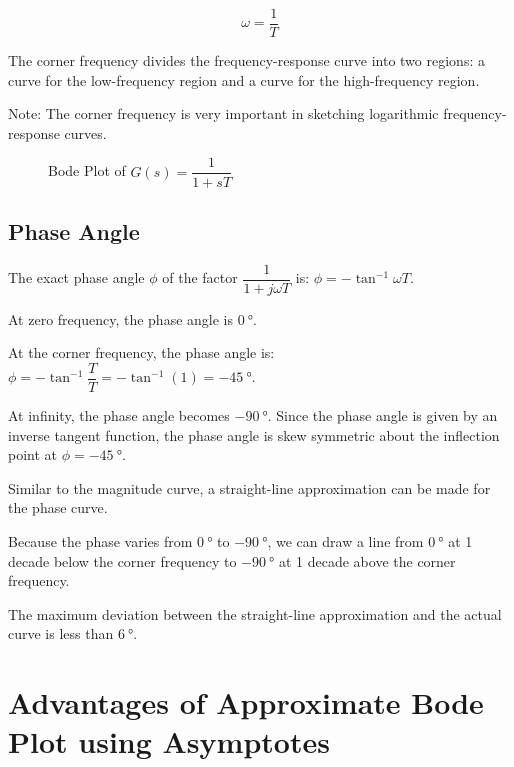 \documentclass[
  14pt,
  a4paper,
  oneside,
  open=any,
  a4paper,
  14pt]{report}
\begin{document}
\[
\omega = \dfrac{1}{T}
\]

The corner frequency divides the frequency-response curve into two
regions: a curve for the low-frequency region and a curve for the
high-frequency region.

Note: The corner frequency is very important in sketching logarithmic
frequency-response curves.

\begin{figure}

\centering{



}

\caption{\label{fig-bode-plot-simple-pole}Bode Plot of
\(G(s) = \dfrac{1}{1+sT}\)}

\end{figure}%

\subsection{Phase Angle}\label{phase-angle-1}

The exact phase angle \(\phi\) of the factor \(\dfrac{1}{1+j\omega T}\)
is: \(\phi = -\tan^{-1} \omega T\).

At zero frequency, the phase angle is \(\SI{0}{\degree}\).

At the corner frequency, the phase angle is:
\(\phi = -\tan^{-1} \dfrac{T}{T} = -\tan^{-1} (1) = \SI{-45}{\degree}\).

At infinity, the phase angle becomes \(\SI{-90}{\degree}\). Since the
phase angle is given by an inverse tangent function, the phase angle is
skew symmetric about the inflection point at \(\phi=\SI{-45}{\degree}\).

Similar to the magnitude curve, a straight-line approximation can be
made for the phase curve.

Because the phase varies from \(\SI{0}{\degree}\) to
\(\SI{-90}{\degree}\), we can draw a line from \(\SI{0}{\degree}\) at 1
decade below the corner frequency to \(\SI{-90}{\degree}\) at 1 decade
above the corner frequency.

The maximum deviation between the straight-line approximation and the
actual curve is less than \(\SI{6}{\degree}\).

\newpage{}

\section{Advantages of Approximate Bode Plot using
Asymptotes}\label{advantages-of-approximate-bode-plot-using-asymptotes}
\end{document}
